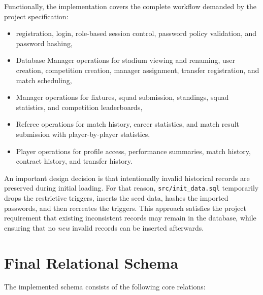 \documentclass[12pt,a4paper]{article}
\begin{document}
Functionally, the implementation covers the complete workflow demanded by the project specification:
\begin{itemize}
    \item registration, login, role-based session control, password policy validation, and password hashing,
    \item Database Manager operations for stadium viewing and renaming, user creation, competition creation, manager assignment, transfer registration, and match scheduling,
    \item Manager operations for fixtures, squad submission, standings, squad statistics, and competition leaderboards,
    \item Referee operations for match history, career statistics, and match result submission with player-by-player statistics,
    \item Player operations for profile access, performance summaries, match history, contract history, and transfer history.
\end{itemize}

An important design decision is that intentionally invalid historical records are preserved during initial loading. For that reason, \texttt{src/init\_data.sql} temporarily drops the restrictive triggers, inserts the seed data, hashes the imported passwords, and then recreates the triggers. This approach satisfies the project requirement that existing inconsistent records may remain in the database, while ensuring that no \emph{new} invalid records can be inserted afterwards.

\section{Final Relational Schema}
The implemented schema consists of the following core relations:
\end{document}
